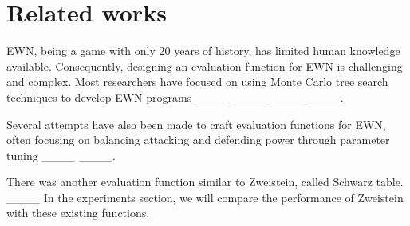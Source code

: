 \section{Related works}
EWN, being a game with only 20 years of history, has limited human knowledge available. Consequently, designing an evaluation function for EWN is challenging and complex. Most researchers have focused on using Monte Carlo tree search techniques to develop EWN programs ____ ____ ____ ____.

    Several attempts have also been made to craft evaluation functions for EWN, often focusing on balancing attacking and defending power through parameter tuning ____ ____.

    There was another evaluation function similar to Zweistein, called Schwarz table. ____ In the experiments section, we will compare the performance of Zweistein with these existing functions.
